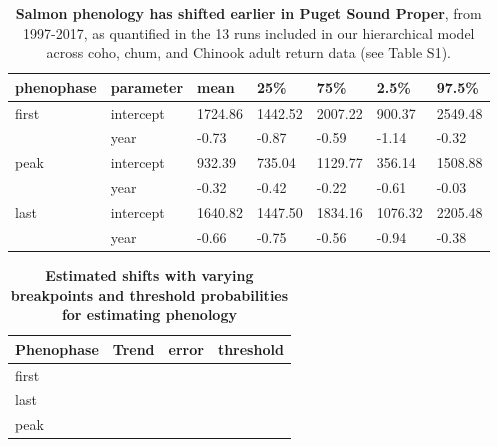 \documentclass{article}
\begin{document}
\begin{table}[ht]
\centering
\caption{\textbf{Salmon phenology has shifted earlier in Puget Sound Proper}, from 1997-2017, as quantified in the 13 runs included in our hierarchical model across coho, chum, and Chinook adult return data (see Table S1).} 
\label{tab:salmtren}
\begingroup\footnotesize
\begin{tabular}{|p{}|p{}|p{}|p{}|p{}|p{}|p{}|}
  \hline
phenophase & parameter & mean & 25\% & 75\% & 2.5\% & 97.5\% \\ 
  \hline
first & intercept & 1724.86 & 1442.52 & 2007.22 &  900.37 & 2549.48 \\ 
   & year & -0.73 & -0.87 & -0.59 & -1.14 & -0.32 \\ 
   \hline
peak & intercept &  932.39 &  735.04 & 1129.77 &  356.14 & 1508.88 \\ 
   & year & -0.32 & -0.42 & -0.22 & -0.61 & -0.03 \\ 
   \hline
last & intercept & 1640.82 & 1447.50 & 1834.16 & 1076.32 & 2205.48 \\ 
   & year & -0.66 & -0.75 & -0.56 & -0.94 & -0.38 \\ 
   \hline
\end{tabular}
\endgroup
\end{table}



\begin{table}[ht]
\centering
\caption{\textbf{Estimated shifts with varying breakpoints and threshold probabilities for estimating phenology}} 
\label{tab:limetab}
\begingroup\footnotesize
\begin{tabular}{|p{}|p{}|p{}|p{}|}
  \hline
Phenophase & Trend & error & threshold \\ 
  \hline
first &  &  &  \\ 
   \hline
last &  &  &  \\ 
  peak &  &  &  \\ 
   \hline
\end{tabular}
\endgroup
\end{table}
\end{document}
